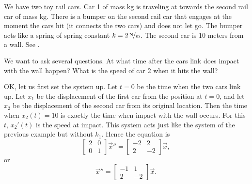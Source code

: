 \begin{example} \label{sosa:railcarexample}
We have two toy rail
cars.  Car 1 of mass \unit[2]{kg} is traveling at 
towards the second
rail car of mass \unit[1]{kg}.  There is a bumper on the second rail car that
engages at the moment the cars hit (it connects the two cars)
and does not let go.
The bumper acts like a spring of spring constant $k=\unitfrac[2]{N}{m}$.
The second
car is 10 meters from a wall.  See .

\begin{myfig}
\capstart
{}
\caption{The crash of two rail cars.\label{sosa:railcarscrashfig}}
\end{myfig}

We want to ask several questions.  At what time after the cars link does
impact with the wall happen?  What is the speed of car 2 when it hits the
wall?

OK\@, let us first set the system up.  Let $t=0$ be the time
when the two cars link up.  Let $x_1$ be the displacement of the first car
from the position at $t=0$, and let $x_2$ be the
displacement of the second car from its original location.  Then the
time when $x_2(t) = 10$ is exactly the time when impact with the wall occurs.
For this $t$, $x_2'(t)$ is the speed at impact.  This system acts just like the
system of the previous example but without $k_1$.  Hence the equation is
\begin{equation*}
\begin{bmatrix}
2 & 0 \\
0 & 1
\end{bmatrix}
{\vec{x}}'' =
\begin{bmatrix}
-2 & 2 \\
2 & -2
\end{bmatrix}
\vec{x} ,
\end{equation*}
or
\begin{equation*}
{\vec{x}}'' =
\begin{bmatrix}
-1 & 1 \\
2 & -2
\end{bmatrix}
\vec{x} .
\end{equation*}


\end{example}
